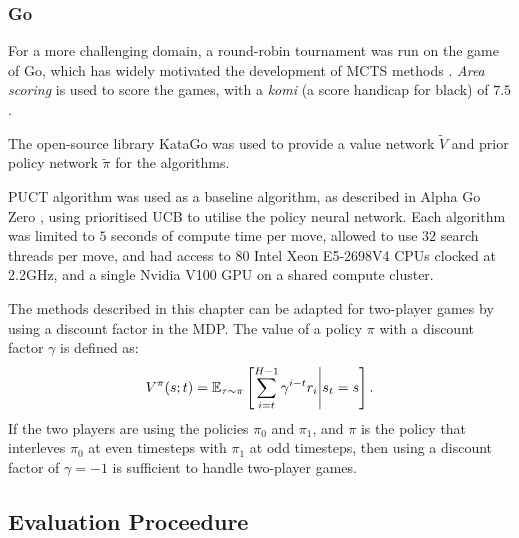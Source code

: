         \subsubsection{Go}
            For a more challenging domain, a round-robin tournament was run on the game of Go, which has widely motivated the development of MCTS methods \cite{gelly2007combining,alpha_go,alpha_go_zero}. \textit{Area scoring} is used to score the games, with a \textit{komi} (a score handicap for black) of $7.5$. 
            
            The open-source library KataGo \cite{katago} was used to provide a value network $\tilde{V}$ and prior policy network $\tilde{\pi}$ for the algorithms. 
            
            PUCT algorithm \cite{poly_uct} was used as a baseline algorithm, as described in Alpha Go Zero \cite{alpha_go_zero}, using prioritised UCB \cite{prio_ucb} to utilise the policy neural network. Each algorithm was limited to $5$ seconds of compute time per move, allowed to use $32$ search threads per move, and had access to 80 Intel Xeon E5-2698V4 CPUs clocked at 2.2GHz, and a single Nvidia V100 GPU on a shared compute cluster.

            The methods described in this chapter can be adapted for two-player games by using a discount factor in the MDP. The value of a policy $\pi$ with a discount factor $\gamma$ is defined as:
            \begin{align}
                V^{\pi}(s;t) = \mathbb{E}_{\tau\sim\pi}\left[\sum_{i=t}^{H-1} \gamma^{i-t}r_i \Bigg| s_t=s \right].
            \end{align}
            If the two players are using the policies $\pi_0$ and $\pi_1$, and $\pi$ is the policy that interleves $\pi_0$ at even timesteps with $\pi_1$ at odd timesteps, then using a discount factor of $\gamma=-1$ is sufficient to handle two-player games. 
        
        












    \subsection{Evaluation Proceedure} 

